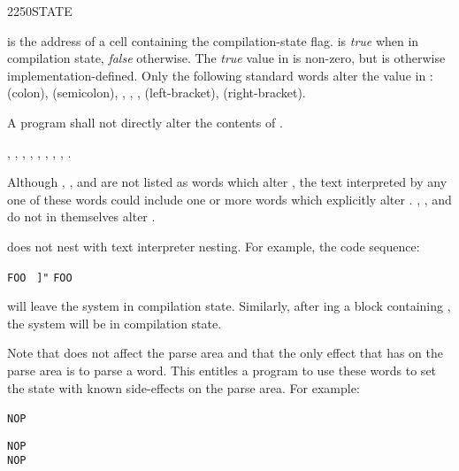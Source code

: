 \begin{worddef}{2250}{STATE}
\item {}

	 is the address of a cell containing the
	compilation-state flag.  is \emph{true} when in
	compilation state, \emph{false} otherwise. The \emph{true} value
	in  is non-zero, but is otherwise
	implementation-defined. Only the following standard words alter
	the value in :
	\word{:} (colon),
	\word{;} (semicolon),
	,
	,
	,
	\word{[} (left-bracket),
	\word{]} (right-bracket).

\note
	A program shall not directly alter the contents of .

\see {},
	,
	,
	,
	\wref{core:[}{[},
	\wref{core:]}{]},
	,
	,
	.

	\begin{rationale} %
		Although
		,
		,
		 and
		are not listed as words which alter , the text
		interpreted by any one of these words could include one or
		more words which explicitly alter .
		,
		,
		 and
		do not in themselves alter .

		 does not nest with text interpreter nesting. For
		example, the code sequence:

		\tab \word{:} \texttt{FOO}~
			 \texttt{]"} 
		\word{;}
		\qquad
		\texttt{FOO}

		will leave the system in compilation state. Similarly, after
		ing a block containing \word{]}, the system
		will be in compilation state.

		Note that \word{]} does not affect the parse area and that the
		only effect that \word{:} has on the parse area is to parse a
		word. This entitles a program to use these words to set the
		state with known side-effects on the parse area. For example:

		\tab \word{:} \texttt{NOP}~
			\word{:}  \word{;} 
		\word{;}

		\tab \texttt{NOP}  \\
		\tab \texttt{NOP} 


\end{rationale}
\end{worddef}
